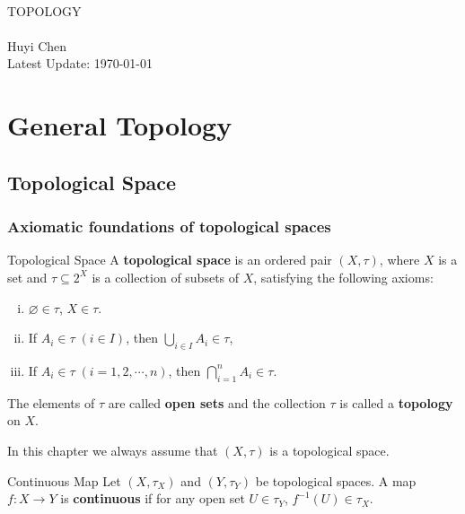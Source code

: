 \documentclass{report}
\begin{document}
\begin{titlepage}
\begin{center}
	~\\
	\vspace{6em}
	\textsc{\Huge TOPOLOGY}
	~\\
	\vspace{2.5em}
	{\Large }
	~\\
	\vspace{6em}
	\textsf{Huyi Chen}
	~\\
	\vspace{5in}
	{\large Latest Update: \today}
\end{center}
\end{titlepage}

\tableofcontents
\thispagestyle{empty}

\chapter{General Topology}
\thispagestyle{empty}
\setcounter{page}{1}

\section{Topological Space}
\subsection{Axiomatic foundations of topological spaces}
\begin{definition}{Topological Space}{}
	A \textbf{topological space} is an ordered pair $(X,\tau)$, where $X$ is a set and $\tau\subseteq2^X $ is a collection of subsets of $X$, satisfying the following axioms:
	\begin{enumerate}[(i)]
		\item $\varnothing\in \tau$, $X\in \tau$.
		\item If $A_i\in\tau\;(i\in I)$, then $\bigcup\limits_{i\in I}A_i\in \tau$,
		\item If $A_i\in\tau\;(i=1,2,\cdots,n)$, then $\bigcap\limits_{i=1}^nA_i\in \tau$.
	\end{enumerate}
	\noindent The elements of $\tau$ are called \textbf{open sets} and the collection $\tau$ is called a \textbf{topology} on $X$.
\end{definition}


\noindent In this chapter we always assume that $(X,\tau)$ is a topological space.

\begin{definition}{Continuous Map}{}
	Let $(X,\tau_X)$ and $(Y,\tau_Y)$ be topological spaces. A map $f:X\to Y$ is \textbf{continuous} if for any open set $U\in\tau_Y$, $f^{-1}(U)\in\tau_X$.
\end{definition}
\end{document}
